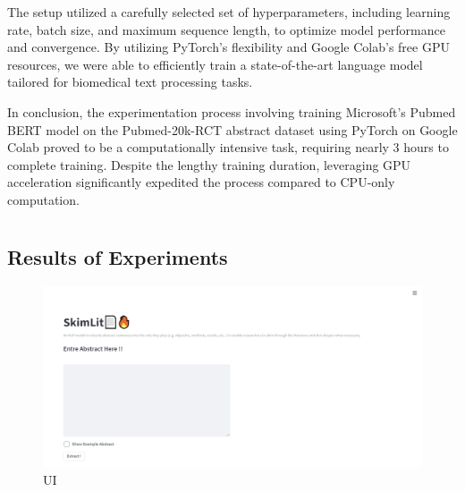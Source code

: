 \documentclass[12pt,a4paper]{report}     %
\begin{document}
\begin{normalsize}
{{The setup utilized a carefully selected set of hyperparameters, including learning rate, batch size, and maximum sequence length, to optimize model performance and convergence. By utilizing PyTorch's flexibility and Google Colab's free GPU resources, we were able to efficiently train a state-of-the-art language model tailored for biomedical text processing tasks.
\par
In conclusion, the experimentation process involving training Microsoft's Pubmed BERT model on the Pubmed-20k-RCT abstract dataset using PyTorch on Google Colab proved to be a computationally intensive task, requiring nearly 3 hours to complete training. Despite the lengthy training duration, leveraging GPU acceleration significantly expedited the process compared to CPU-only computation.

\par


\newpage 
\chapter{}
{\setlength{\baselineskip}{1.1\baselineskip}
\section{Results of Experiments }

\begin{figure}[h]
    \centering
    \includegraphics[width=14cm]{UI.png}
    \caption{UI}
    \label{fig: sequence diagram}
\end{figure}


}}}
\end{normalsize}
\end{document}

